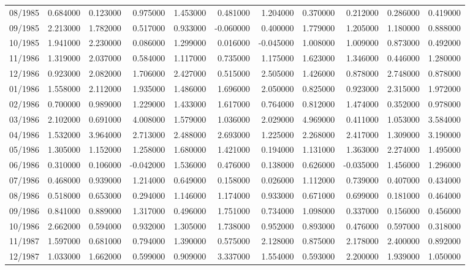 \begin{tabular}{lrrrrrrrrrr}
08/1985 & 0.684000 & 0.123000 & 0.975000 & 1.453000 & 0.481000 & 1.204000 & 0.370000 & 0.212000 & 0.286000 & 0.419000 \\
09/1985 & 2.213000 & 1.782000 & 0.517000 & 0.933000 & -0.060000 & 0.400000 & 1.779000 & 1.205000 & 1.180000 & 0.888000 \\
10/1985 & 1.941000 & 2.230000 & 0.086000 & 1.299000 & 0.016000 & -0.045000 & 1.008000 & 1.009000 & 0.873000 & 0.492000 \\
11/1986 & 1.319000 & 2.037000 & 0.584000 & 1.117000 & 0.735000 & 1.175000 & 1.623000 & 1.346000 & 0.446000 & 1.280000 \\
12/1986 & 0.923000 & 2.082000 & 1.706000 & 2.427000 & 0.515000 & 2.505000 & 1.426000 & 0.878000 & 2.748000 & 0.878000 \\
01/1986 & 1.558000 & 2.112000 & 1.935000 & 1.486000 & 1.696000 & 2.050000 & 0.825000 & 0.923000 & 2.315000 & 1.972000 \\
02/1986 & 0.700000 & 0.989000 & 1.229000 & 1.433000 & 1.617000 & 0.764000 & 0.812000 & 1.474000 & 0.352000 & 0.978000 \\
03/1986 & 2.102000 & 0.691000 & 4.008000 & 1.579000 & 1.036000 & 2.029000 & 4.969000 & 0.411000 & 1.053000 & 3.584000 \\
04/1986 & 1.532000 & 3.964000 & 2.713000 & 2.488000 & 2.693000 & 1.225000 & 2.268000 & 2.417000 & 1.309000 & 3.190000 \\
05/1986 & 1.305000 & 1.152000 & 1.258000 & 1.680000 & 1.421000 & 0.194000 & 1.131000 & 1.363000 & 2.274000 & 1.495000 \\
06/1986 & 0.310000 & 0.106000 & -0.042000 & 1.536000 & 0.476000 & 0.138000 & 0.626000 & -0.035000 & 1.456000 & 1.296000 \\
07/1986 & 0.468000 & 0.939000 & 1.214000 & 0.649000 & 0.158000 & 0.026000 & 1.112000 & 0.739000 & 0.407000 & 0.434000 \\
08/1986 & 0.518000 & 0.653000 & 0.294000 & 1.146000 & 1.174000 & 0.933000 & 0.671000 & 0.699000 & 0.181000 & 0.464000 \\
09/1986 & 0.841000 & 0.889000 & 1.317000 & 0.496000 & 1.751000 & 0.734000 & 1.098000 & 0.337000 & 0.156000 & 0.456000 \\
10/1986 & 2.662000 & 0.594000 & 0.932000 & 1.305000 & 1.738000 & 0.952000 & 0.893000 & 0.476000 & 0.597000 & 0.318000 \\
11/1987 & 1.597000 & 0.681000 & 0.794000 & 1.390000 & 0.575000 & 2.128000 & 0.875000 & 2.178000 & 2.400000 & 0.892000 \\
12/1987 & 1.033000 & 1.662000 & 0.599000 & 0.909000 & 3.337000 & 1.554000 & 0.593000 & 2.200000 & 1.939000 & 1.050000 \\

\end{tabular}
